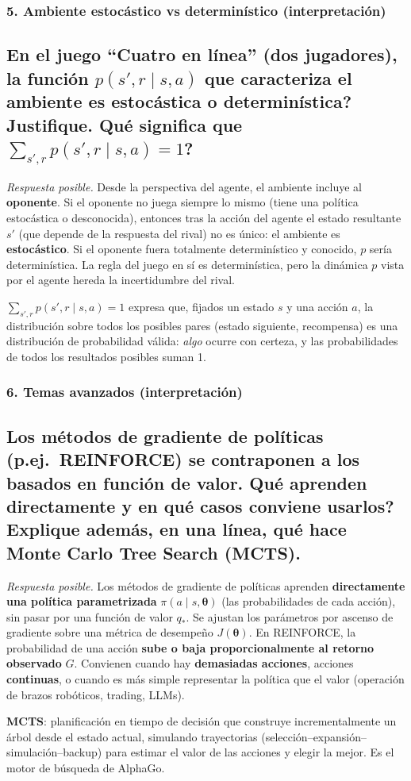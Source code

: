 \documentclass[11pt, a4paper]{article}
\newcommand{\pregunta}[1]{\subsection{#1}}
\newcommand{\eje}[1]{\subsubsection{#1}}
\begin{document}
\eje{5. Ambiente estoc\'astico vs determin\'istico (interpretaci\'on)}
\pregunta{En el juego ``Cuatro en l\'inea'' (dos jugadores), \textquestiondown la funci\'on $p(s',r\mid s,a)$ que caracteriza el ambiente es estoc\'astica o determin\'istica? Justifique. \textquestiondown Qu\'e significa que $\sum_{s',r} p(s',r\mid s,a)=1$?}

\begin{respuesta}
\textit{Respuesta posible.} Desde la perspectiva del agente, el ambiente incluye al \textbf{oponente}. Si el oponente no juega siempre lo mismo (tiene una pol\'itica estoc\'astica o desconocida), entonces tras la acci\'on del agente el estado resultante $s'$ (que depende de la respuesta del rival) no es \'unico: el ambiente es \textbf{estoc\'astico}. Si el oponente fuera totalmente determin\'istico y conocido, $p$ ser\'ia determin\'istica. La regla del juego en s\'i es determin\'istica, pero la din\'amica $p$ vista por el agente hereda la incertidumbre del rival.

$\sum_{s',r} p(s',r\mid s,a)=1$ expresa que, fijados un estado $s$ y una acci\'on $a$, la distribuci\'on sobre todos los posibles pares (estado siguiente, recompensa) es una distribuci\'on de probabilidad v\'alida: \emph{algo} ocurre con certeza, y las probabilidades de todos los resultados posibles suman 1.
\end{respuesta}

\eje{6. Temas avanzados (interpretaci\'on)}
\pregunta{Los m\'etodos de \textbf{gradiente de pol\'iticas} (p.ej.\ REINFORCE) se contraponen a los basados en funci\'on de valor. \textquestiondown Qu\'e aprenden directamente y en qu\'e casos conviene usarlos? Explique adem\'as, en una l\'inea, qu\'e hace \textbf{Monte Carlo Tree Search (MCTS)}.}

\begin{respuesta}
\textit{Respuesta posible.} Los m\'etodos de gradiente de pol\'iticas aprenden \textbf{directamente una pol\'itica parametrizada} $\pi(a\mid s,\boldsymbol\theta)$ (las probabilidades de cada acci\'on), sin pasar por una funci\'on de valor $q_*$. Se ajustan los par\'ametros por ascenso de gradiente sobre una m\'etrica de desempe\~no $J(\boldsymbol\theta)$. En REINFORCE, la probabilidad de una acci\'on \textbf{sube o baja proporcionalmente al retorno observado} $G$. Convienen cuando hay \textbf{demasiadas acciones}, acciones \textbf{continuas}, o cuando es m\'as simple representar la pol\'itica que el valor (operaci\'on de brazos rob\'oticos, trading, LLMs).

\textbf{MCTS}: planificaci\'on en tiempo de decisi\'on que construye incrementalmente un \'arbol desde el estado actual, simulando trayectorias (selecci\'on--expansi\'on--simulaci\'on--backup) para estimar el valor de las acciones y elegir la mejor. Es el motor de b\'usqueda de AlphaGo.
\end{respuesta}
\end{document}
